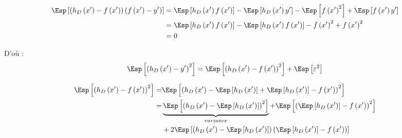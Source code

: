 \begin{reponse}
	\begin{align*}
		\Esp\left[\left(h_D\left({x^{\prime}}\right) - f\left(x^{\prime}\right)\right)\left(f\left(x^{\prime}\right)- y^{\prime}\right)\right]
		 & =
		\Esp\left[h_D\left({x^{\prime}}\right)f\left(x^{\prime}\right)\right]
		- \Esp\left[h_D\left({x^{\prime}}\right)y^{\prime}\right]
		- \Esp\left[f\left(x^{\prime}\right)^{2}\right]
		+ \Esp\left[f\left(x^{\prime}\right)y^{\prime}\right]                      \\
		 & = \Esp\left[h_D\left({x^{\prime}}\right)f\left(x^{\prime}\right)\right]
		- \Esp\left[h_D\left({x^{\prime}}\right)f\left(x^{\prime}\right)\right]
		- f\left(x^{\prime}\right)^{2}
		+ f\left(x^{\prime}\right)^{2}                                             \\
		 & = 0
	\end{align*}

	D'où :
	$$\Esp\left[\left(h_D\left({x^{\prime}}\right) - y^{\prime}\right)^2\right]
		= \Esp\left[\left(h_D\left({x^{\prime}}\right) - f\left(x^{\prime}\right)\right)^2\right]
		+ \Esp\left[\varepsilon^2\right]$$

	\begin{align*}
		\Esp\left[\left(h_D\left({x^{\prime}}\right) - f\left(x^{\prime}\right)\right)^2\right]
		=  & \Esp\left[\left(h_D\left({x^{\prime}}\right) - \Esp\left[h_D\left({x^{\prime}}\right)\right]+\Esp\left[h_D\left({x^{\prime}}\right)\right]-f\left(x^{\prime}\right)\right)^2\right]               \\
		=  & \underbrace{\Esp\left[\left(h_D\left({x^{\prime}}\right) - \Esp\left[h_D\left({x^{\prime}}\right)\right]\right)^2\right]}_{variance}
		+ \Esp\left[\left(\Esp\left[h_D\left({x^{\prime}}\right)\right]-f\left(x^{\prime}\right)\right)^2\right]                                                                                               \\
		{} & + 2 \Esp\left[\left(h_D\left({x^{\prime}}\right) - \Esp\left[h_D\left({x^{\prime}}\right)\right]\right)\left(\Esp\left[h_D\left({x^{\prime}}\right)\right]-f\left(x^{\prime}\right)\right)\right]
	\end{align*}


\end{reponse}
